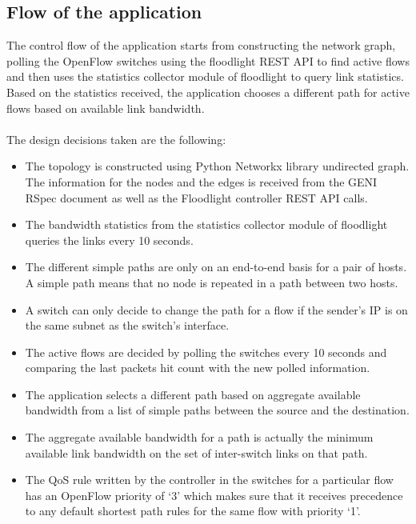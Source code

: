 \documentclass[paper=a4, fontsize=12pt]{scrartcl}	%
\numberwithin{equation}{section}		%
\numberwithin{figure}{section}			%
\numberwithin{table}{section}				%
\begin{document}
\subsection{Flow of the application}
The control flow of the application starts from constructing the network graph, polling the OpenFlow switches using the floodlight REST API to find active flows and then uses the statistics collector module of floodlight to query link statistics. Based on the statistics received, the application chooses a different path for active flows based on available link bandwidth.
\\
\\
The design decisions taken are the following:
\begin{itemize}
\item The topology is constructed using Python Networkx library undirected graph. The information for the nodes and the edges is received from the GENI RSpec document as well as the Floodlight controller REST API calls.
\item The bandwidth statistics from the statistics collector module of floodlight queries the links every 10 seconds.
\item The different simple paths are only on an end-to-end basis for a pair of hosts. A simple path means that no node is repeated in a path between two hosts.
\item A switch can only decide to change the path for a flow if the sender's IP is on the same subnet as the switch's interface.
\item The active flows are decided by polling the switches every 10 seconds and comparing the last packets hit count with the new polled information.
\item The application selects a different path based on aggregate available bandwidth from a list of simple paths between the source and the destination.
\item The aggregate available bandwidth for a path is actually the minimum available link bandwidth on the set of inter-switch links on that path.
\item The QoS rule written by the controller in the switches for a particular flow has an OpenFlow priority of `3' which makes sure that it receives precedence to any default shortest path rules for the same flow with priority `1'.

\end{itemize}
\end{document}
